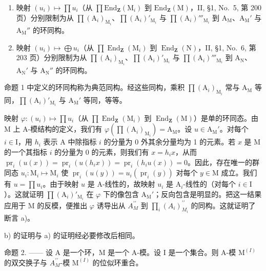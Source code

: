 \begin{enumerate}
\def\labelenumi{\alph{enumi})}
\item
  映射 \((u_i) \mapsto \prod u_i\)（从 \(\prod \mathrm{End}_{\mathbf{Z}}(\mathrm{M}_i)\) 到 \(\mathrm{End}_{\mathbf{Z}}(\mathrm{M})\)，II, §1, No.~5, 第 200 页）分别限制为从 \(\prod (\mathrm{A}_i)_{\mathrm{M}_i}\)、\(\prod (\mathrm{A}_i)'_{\mathrm{M}_i}\) 与 \(\prod (\mathrm{A}_i)'''_{\mathrm{M}_i}\) 到 \(\mathrm{A}_{\mathrm{M}}\)、\(\mathrm{A}_{\mathrm{M}}'\) 与 \(\mathrm{A}_{\mathrm{M}}''\) 的环同构。
\item
  映射 \((u_i) \mapsto \bigoplus u_i\)（从 \(\prod \operatorname{End}_{\mathbf{Z}}(\mathrm{M}_i)\) 到 \(\operatorname{End}_{\mathbf{Z}}(\mathrm{N})\)，II, §1, No.~6, 第 203 页）分别限制为从 \(\prod (\mathrm{A}_i)_{\mathrm{M}_i}\)、\(\prod (\mathrm{A}_i)'_{\mathrm{M}_i}\) 与 \(\prod (\mathrm{A}_i)'''_{\mathrm{M}_i}\) 到 \(\mathrm{A_N}\)、\(\mathrm{A_N}'\) 与 \(\mathrm{A_N}''\) 的环同构。
\end{enumerate}

命题 1 中定义的环同构称为典范同构。经这些同构，乘积 \(\prod (\mathrm{A}_i)_{\mathrm{M}_i}\) 常与 \(\mathrm{A_M}\) 等同，\(\prod (\mathrm{A}_i)'_{\mathrm{M}_i}\) 与 \(\mathrm{A_M}'\) 等同，等等。

映射 \(\varphi : (u_i) \mapsto \prod u_i\)（从 \(\prod \operatorname{End}_{\mathbf{Z}}(\mathrm{M}_i)\) 到 \(\operatorname{End}_{\mathbf{Z}}(\mathrm{M})\)）是单的环同态。由 M 上 A-模结构的定义，我们有 \(\varphi(\prod (\mathrm{A}_i)_{\mathrm{M}_i}) = \mathrm{A}_{\mathrm{M}}\)。设 \(u \in \mathrm{A}_{\mathrm{M}}'\)。对每个 \(i \in \mathrm{I}\)，用 \(h_i\) 表示 A 中除指标 \(i\) 的分量为 0 外其余分量均为 1 的元素。若 \(x\) 是 M 的一个其指标 \(i\) 的分量为 0 的元素，则我们有 \(x = h_i x\)，从而 \(\operatorname{pr}_i(u(x)) = \operatorname{pr}_i(u(h_i x)) = \operatorname{pr}_i(h_i u(x)) = 0\)。因此，存在唯一的群同态 \(u_i: \mathrm{M}_i \mapsto \mathrm{M}_i\) 使 \(\operatorname{pr}_i(u(y)) = u_i(\operatorname{pr}_i(y))\) 对每个 \(y \in \mathrm{M}\) 成立。我们有 \(u = \prod u_i\)。由于映射 \(u\) 是 A-线性的，故映射 \(u_i\) 是 \(\mathrm{A}_i\)-线性的（对每个 \(i \in \mathrm{I}\)）。这就证明 \(\prod (\mathrm{A}_i)'_{\mathrm{M}_i}\) 在 \(\varphi\) 下的像包含 \(\mathrm{A}_{\mathrm{M}}'\)；反向包含是明显的。把这一结果应用于 M 的反模，便推出 \(\varphi\) 诱导出从 \(A_{M}^{\prime \prime}\) 到 \(\prod_i(A_i)_{M_i}^{\prime \prime}\) 的同构。这就证明了断言 a)。

b) 的证明与 a) 的证明经必要修改后相同。

命题 2. —— 设 A 是一个环，M 是一个 A-模。设 I 是一个集合。则 A-模 \(\mathrm{M}^{(I)}\) 的双交换子与 \(A_{M}^{\prime\prime}\)-模 \(\mathrm{M}^{(I)}\) 的位似环重合。

